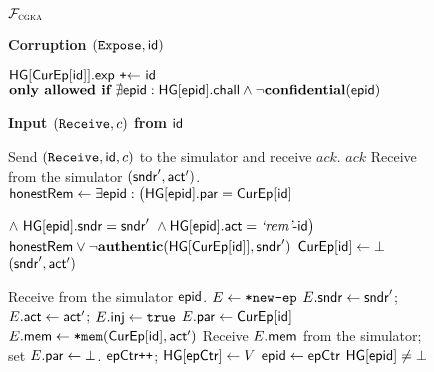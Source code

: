 \begin{figure*}[!tbp]
\begin{systembox}{\normalsize$\mathcal{F}_{\normalfont\textsc{cgka}}$}
{\begin{minipage}[t]{0.47\linewidth}
    \medskip
    {\bf Corruption $({\normalfont\texttt{Expose}},{\mathsf{id}})$}
    \begin{algorithmic}
      \If{$\ptr[\id]\neq\bot$}
    	  \State $\mathsf{HG}[\textsf{CurEp}[{\mathsf{id}}]].\mathsf{exp} \ \texttt{+$\gets$}\  {\mathsf{id}}$
      \EndIf
      \State \vspace*{-.1em}
      \State $\textbf{only allowed if}\ \nexists\hgnodeid : \setvert[\hgnodeid].\hgc \land \neg\KwConf{}(\hgnodeid)$
    \end{algorithmic}


  \end{minipage}}\hspace*{1em}\hfill
  {\begin{minipage}[t]{0.52\linewidth}
    {\bf Input $({\normalfont\texttt{Receive}},c)$ from ${\mathsf{id}}$}
    \begin{algorithmic}
      \State {}
      \State Send $({\normalfont\texttt{Receive}},{\mathsf{id}},c)$ to the simulator and receive $\mathit{ack}$.
      \State\KwReq{} $\mathit{ack}$
      \State {}
      \State Receive from the simulator $(\mathsf{sndr}', \mathsf{act}')$.
        \State $\textnormal{\textsf{honestRem}} \gets \exists {\normalfont\textsf{epid}} : \big( \mathsf{HG}[{\normalfont\textsf{epid}}].\mathsf{par} = \textsf{CurEp}[{\mathsf{id}}]$\\\strut\hfill$ \land\  \mathsf{HG}[{\normalfont\textsf{epid}}].\mathsf{sndr} = \mathsf{sndr}' \ \land  \mathsf{HG}[{\normalfont\textsf{epid}}].\mathsf{act} = {\text{\normalfont \it`rem'}}\textrm{-}{\ensuremath{\mathsf{id}}}\big)$
        \State \KwAss{} $\textnormal{\textsf{honestRem}} \lor \neg \textnormal{\textbf{authentic}}{}(\mathsf{HG}[\textsf{CurEp}[{\mathsf{id}}]], \mathsf{sndr}')$
        \State $\textsf{CurEp}[{\mathsf{id}}] \gets \bot$
        \State \Return $(\mathsf{sndr}', \mathsf{act}')$
      \EndIf

      \State {}
      \State Receive from the simulator ${\normalfont\textsf{epid}}$.
      \If{$\hgnodeid = \bot$}
        \State $E \gets {\ensuremath{\textnormal{\tt*new-ep}}}$
        \State $E.\mathsf{sndr} \gets \mathsf{sndr}'$; $E.\mathsf{act} \gets \mathsf{act}'$; $E.\textsf{inj} \gets {\normalfont\texttt{true}}$
        \If{$\ptr[\id]\neq\bot$}
          \State\vspace*{-.2em} 
          \State $E.\mathsf{par} \gets \textsf{CurEp}[{\mathsf{id}}]$
          \State $E.\mathsf{mem} \gets {\ensuremath{\textnormal{\tt*mem}}}(\textsf{CurEp}[{\mathsf{id}}],\mathsf{act}')$
        \Else
          \State\vspace*{-.2em} 
          \State Receive $E.\mathsf{mem}$ from the simulator; set $E.\mathsf{par}\gets\bot$.
        \EndIf
        \State $\textsf{epCtr}\texttt{++}$; $\mathsf{HG}[\textsf{epCtr}] \gets V$
        \State ${\normalfont\textsf{epid}} \gets \textsf{epCtr}$
      \EndIf
      \State \KwAss{} $\mathsf{HG}[{\normalfont\textsf{epid}}] \neq \bot$


\end{algorithmic}
\end{minipage}}
\end{systembox}
\end{figure*}
